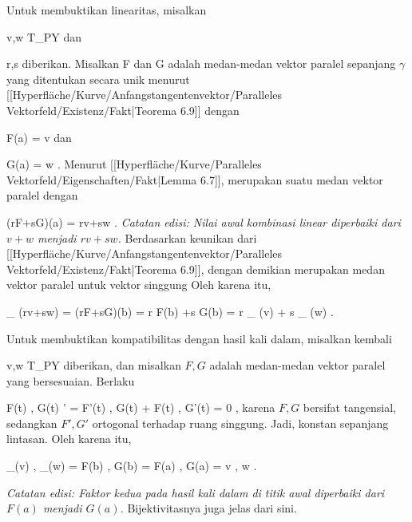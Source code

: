 {

Untuk membuktikan linearitas, misalkan

\mavergleichskette
{\vergleichskette
{ v,w
}
{ \in }{ T_PY
}
{  }{
}
{    }{
}
{   }{
}
}
{}{}{}
dan

\mavergleichskette
{\vergleichskette
{ r,s
}
{ \in }{ \R
}
{  }{
}
{    }{
}
{   }{
}
}
{}{}{}
diberikan. Misalkan
\mathkor {} {F} {dan} {G} {}
adalah medan-medan vektor paralel sepanjang $\gamma$ yang ditentukan secara unik menurut
[[Hyperfläche/Kurve/Anfangstangentenvektor/Paralleles Vektorfeld/Existenz/Fakt|Teorema 6.9]]
dengan

\mavergleichskette
{\vergleichskette
{ F(a)
}
{ = }{ v
}
{  }{
}
{    }{
}
{   }{
}
}
{}{}{}
dan

\mavergleichskette
{\vergleichskette
{ G(a)
}
{ = }{ w
}
{  }{
}
{    }{
}
{   }{
}
}
{}{}{.}
Menurut
[[Hyperfläche/Kurve/Paralleles Vektorfeld/Eigenschaften/Fakt|Lemma 6.7]],
 merupakan suatu medan vektor paralel dengan

\mavergleichskette
{\vergleichskette
{ (rF+sG)(a)
}
{ = }{ rv+sw
}
{  }{
}
{    }{
}
{   }{
}
}
{}{}{.}
\emph{Catatan edisi: Nilai awal kombinasi linear diperbaiki dari $v+w$ menjadi $rv+sw$.}
Berdasarkan keunikan dari
[[Hyperfläche/Kurve/Anfangstangentenvektor/Paralleles Vektorfeld/Existenz/Fakt|Teorema 6.9]],
 dengan demikian merupakan medan vektor paralel untuk vektor singgung
 Oleh karena itu,

\mavergleichskettedisp
{\vergleichskette
{ \Psi_{\gamma} (rv+sw)
}
{ =} { (rF+sG)(b)
}
{ =} { r F(b) +s G(b)
}
{ =} { r \Psi_{\gamma} (v) + s \Psi_{\gamma} (w)
}
{ } {
}
}
{}{}{.}

Untuk membuktikan kompatibilitas dengan hasil kali dalam, misalkan kembali

\mavergleichskette
{\vergleichskette
{ v,w
}
{ \in }{ T_PY
}
{  }{
}
{    }{
}
{   }{
}
}
{}{}{}
diberikan, dan misalkan $F,G$ adalah medan-medan vektor paralel yang bersesuaian. Berlaku

\mavergleichskettedisp
{\vergleichskette
{ \left\langle  F(t) , G(t)  \right\rangle'
}
{ =} { \left\langle  F'(t) , G(t)  \right\rangle  +  \left\langle  F(t) , G'(t)  \right\rangle
}
{ =} { 0
}
{ } {
}
{ } {
}
}
{}{}{,}
karena $F,G$ bersifat tangensial, sedangkan $F',G'$ ortogonal terhadap ruang singgung. Jadi,
 konstan sepanjang lintasan. Oleh karena itu,

\mavergleichskettedisp
{\vergleichskette
{ \left\langle \Psi_\gamma(v)  , \Psi_\gamma(w)  \right\rangle
}
{ =} { \left\langle  F(b)  ,  G(b)   \right\rangle
}
{ =} { \left\langle  F(a)  ,  G(a)   \right\rangle
}
{ =} { \left\langle  v  , w  \right\rangle
}
{ } {
}
}
{}{}{.}

\emph{Catatan edisi: Faktor kedua pada hasil kali dalam di titik awal diperbaiki dari $F(a)$ menjadi $G(a)$.}
Bijektivitasnya juga jelas dari sini.

}

